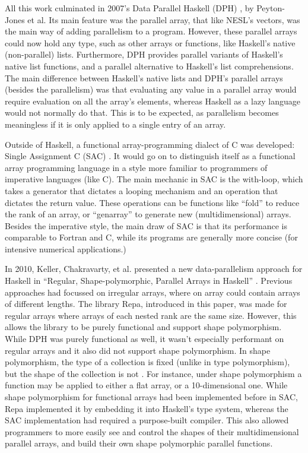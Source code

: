         All this work culminated in 2007's Data Parallel Haskell (DPH) \cite{peyton2008harnessing}, by Peyton-Jones et al.
        Its main feature was the parallel array, that like NESL's vectors, was the main way of adding parallelism to a program.
        However, these parallel arrays could now hold any type, such as other arrays or functions, like Haskell's native (non-parallel) lists.
        Furthermore, DPH provides parallel variants of Haskell's native list functions, and a parallel alternative to Haskell's list comprehensions.
        The main difference between Haskell's native lists and DPH's parallel arrays (besides the parallelism) was that evaluating any value in a parallel array would require evaluation on all the array's elements, whereas Haskell as a lazy language would not normally do that.
        This is to be expected, as parallelism becomes meaningless if it is only applied to a single entry of an array.

        Outside of Haskell, a functional array-programming dialect of C was developed: Single Assignment C (SAC) \cite{scholz1994single, scholz2003single, grelck2005generic}.
        It would go on to distinguish itself as a functional array programming language in a style more familiar to programmers of imperative languages (like C).
        The main mechanic in SAC is the with-loop, which takes a generator that dictates a looping mechanism and an operation that dictates the return value.
        These operations can be functions like ``fold'' to reduce the rank of an array, or ``genarray'' to generate new (multidimensional) arrays.
        Besides the imperative style, the main draw of SAC is that its performance is comparable to Fortran and C, while its programs are generally more concise (for intensive numerical applications.)

        In 2010, Keller, Chakravarty, et al. presented a new data-parallelism approach for Haskell in ``Regular, Shape-polymorphic, Parallel Arrays in Haskell'' \cite{keller2010regular}.
        Previous approaches had focussed on irregular arrays, where on array could contain arrays of different lengths.
        The library Repa, introduced in this paper, was made for regular arrays where arrays of each nested rank are the same size.
        However, this allows the library to be purely functional and support shape polymorphism.
        While DPH was purely functional as well, it wasn't especially performant on regular arrays and it also did not support shape polymorphism.
        In shape polymorphism, the type of a collection is fixed (unlike in type polymorphism), but the shape of the collection is not \cite{jay1994shapely}.
        For instance, under shape polymorphism a function may be applied to either a flat array, or a 10-dimensional one.
        While shape polymorphism for functional arrays had been implemented before in SAC, Repa implemented it by embedding it into Haskell's type system, whereas the SAC implementation had required a purpose-built compiler.
        This also allowed programmers to more easily see and control the shapes of their multidimensional parallel arrays, and build their own shape polymorphic parallel functions.

